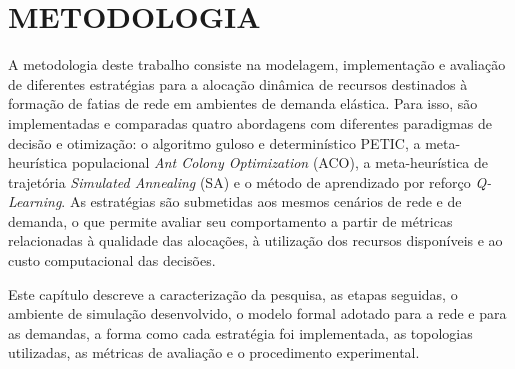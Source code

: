 
\chapter{METODOLOGIA}
\label{cap:metodologia}

A metodologia deste trabalho consiste na modelagem, implementação e avaliação de diferentes estratégias para a alocação dinâmica de recursos destinados à formação de fatias de rede em ambientes de demanda elástica. Para isso, são implementadas e comparadas quatro abordagens com diferentes paradigmas de decisão e otimização: o algoritmo guloso e determinístico PETIC, a meta-heurística populacional \textit{Ant Colony Optimization} (ACO), a meta-heurística de trajetória \textit{Simulated Annealing} (SA) e o método de aprendizado por reforço \textit{Q-Learning}. As estratégias são submetidas aos mesmos cenários de rede e de demanda, o que permite avaliar seu comportamento a partir de métricas relacionadas à qualidade das alocações, à utilização dos recursos disponíveis e ao custo computacional das decisões.

Este capítulo descreve a caracterização da pesquisa, as etapas seguidas, o ambiente de simulação desenvolvido, o modelo formal adotado para a rede e para as demandas, a forma como cada estratégia foi implementada, as topologias utilizadas, as métricas de avaliação e o procedimento experimental.

